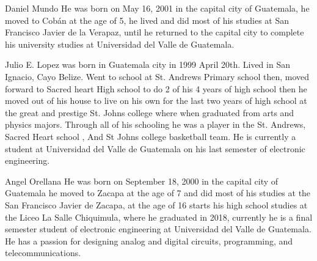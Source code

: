 
\begin{IEEEbiography}{Daniel Mundo}
    He was born on May 16, 2001 in the capital city of Guatemala, he moved to Cobán at the age of 5, he lived and did most of his studies at San Francisco Javier de la Verapaz, until he returned to the capital city to complete his university studies at Universidad del Valle de Guatemala.
    \end{IEEEbiography}

\begin{IEEEbiography}{Julio E. Lopez}
    was born in Guatemala city in 1999 April 20th. Lived in San Ignacio, Cayo Belize. Went to school at
    St. Andrews Primary school then, moved forward to Sacred heart High school to do 2 of
    his 4 years of high school then he moved out of his house to live on his own for the last
    two years of high school at the great and prestige St. Johns college where when graduated from
    arts and physics majors. Through all of his schooling he was a player in the St. Andrews, Sacred Heart school , And St Johns
    college basketball team. He is currently a student at Universidad del Valle de Guatemala on his last semester of electronic engineering.
\end{IEEEbiography}

\begin{IEEEbiography}{Angel Orellana}
    He was born on September 18, 2000 in the capital city of Guatemala
    he moved to Zacapa at the age of 7 and did most of his studies at the
    San Francisco Javier de Zacapa, at the age of 16 starts his high school studies at the
    Liceo La Salle Chiquimula, where he graduated in 2018, currently
    he is a final semester student of 
    electronic engineering at Universidad del Valle 
    de Guatemala. He has a passion for designing analog and digital circuits, 
    programming, and telecommunications.
\end{IEEEbiography}

